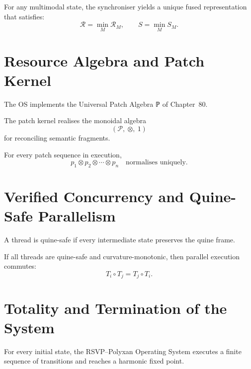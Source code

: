 \begin{theorem}
For any multimodal state,  
the synchroniser yields a unique fused representation that satisfies:
\[
\mathcal{R} = \min_M \mathcal{R}_M,
\qquad
S = \min_M S_M.
\]
\end{theorem}

\section{Resource Algebra and Patch Kernel}
\label{sec:60:patch}

The OS implements the Universal Patch Algebra ℙ of Chapter~80.

\begin{definition}
The patch kernel realises the monoidal algebra
\[
(\mathcal{P},\ \otimes,\ 1)
\]
for reconciling semantic fragments.
\end{definition}

\begin{theorem}
For every patch sequence in execution,
\[
p_1\otimes p_2 \otimes \cdots \otimes p_n
\quad\text{normalises uniquely.}
\]
\end{theorem}

\section{Verified Concurrency and Quine-Safe Parallelism}
\label{sec:60:concurrency}

\begin{definition}
A thread is quine-safe if every intermediate state preserves the quine frame.
\end{definition}

\begin{theorem}
If all threads are quine-safe and curvature-monotonic,
then parallel execution commutes:
\[
T_i\circ T_j = T_j\circ T_i.
\]
\end{theorem}

\section{Totality and Termination of the System}
\label{sec:60:termination}

\begin{theorem}
For every initial state,  
the RSVP--Polyxan Operating System executes a finite sequence of transitions and reaches a harmonic fixed point.
\end{theorem}

